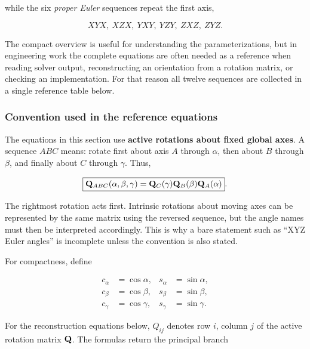 while the six \textit{proper Euler} sequences repeat the first axis,

\begin{equation}
    XYX,\ XZX,\ YXY,\ YZY,\ ZXZ,\ ZYZ.
\end{equation}

The compact overview is useful for understanding the parameterizations, but in
engineering work the complete equations are often needed as a reference when
reading solver output, reconstructing an orientation from a rotation matrix, or
checking an implementation. For that reason all twelve sequences are collected in a single reference
table below.

\subsubsection{Convention used in the reference equations}

The equations in this section use \textbf{active rotations about fixed global
axes}. A sequence $ABC$ means: rotate first about axis $A$ through $\alpha$,
then about $B$ through $\beta$, and finally about $C$ through $\gamma$. Thus,

\begin{equation}\label{eq:coord-euler-sequence-convention}
    \boxed{
    \mathbf{Q}_{ABC}(\alpha,\beta,\gamma)
    =\mathbf{Q}_{C}(\gamma)\mathbf{Q}_{B}(\beta)\mathbf{Q}_{A}(\alpha)
    }.
\end{equation}

The rightmost rotation acts first. Intrinsic rotations about moving axes can be
represented by the same matrix using the reversed sequence, but the angle names
must then be interpreted accordingly. This is why a bare statement such as
``XYZ Euler angles'' is incomplete unless the convention is also stated.

For compactness, define

\begin{equation}
\begin{aligned}
    c_\alpha&=\cos\alpha, & s_\alpha&=\sin\alpha,\\
    c_\beta&=\cos\beta,  & s_\beta&=\sin\beta,\\
    c_\gamma&=\cos\gamma,& s_\gamma&=\sin\gamma.
\end{aligned}
\end{equation}

For the reconstruction equations below, $Q_{ij}$ denotes row $i$, column $j$
of the active rotation matrix $\mathbf{Q}$. The formulas return the principal branch

